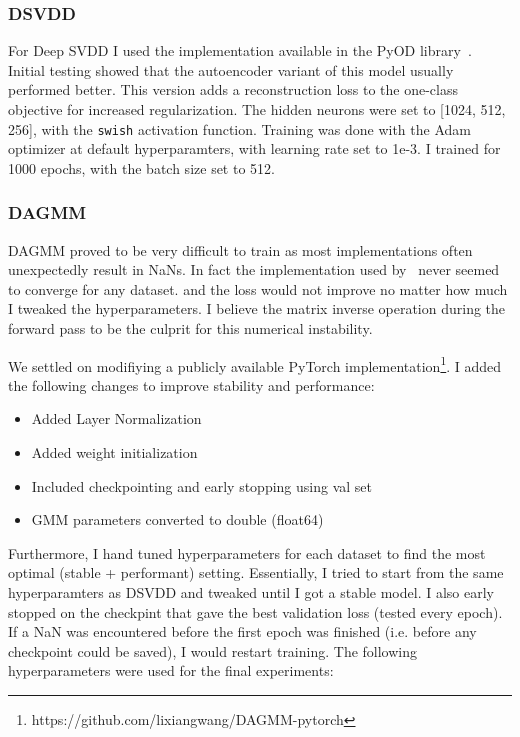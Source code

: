 \subsubsection*{DSVDD}
For Deep SVDD I used the implementation available in the PyOD library~\cite{zhao2019pyod}. Initial testing showed that the autoencoder variant of this model usually performed better. This version adds a reconstruction loss to the one-class objective for increased regularization. The hidden neurons were set to [1024, 512, 256], with the \texttt{swish} activation function. Training was done with the Adam optimizer at default hyperparamters, with learning rate set to 1e-3. I trained for 1000 epochs, with the batch size set to 512.

\subsubsection*{DAGMM}
DAGMM proved to be very difficult to train as most implementations often unexpectedly result in NaNs. In fact the implementation used by~\cite{han2022adbench} never seemed to converge for any dataset. and the loss would not improve no matter how much I tweaked the hyperparameters. I believe the matrix inverse operation during the forward pass to be the culprit for this numerical instability. 

We settled on modifiying a publicly available PyTorch implementation\footnote{https://github.com/lixiangwang/DAGMM-pytorch}. I added the following changes to improve stability and performance:

\begin{itemize}
    \item Added Layer Normalization
    \item Added weight initialization
    \item Included checkpointing and early stopping using val set
    \item GMM parameters converted to double (float64)
\end{itemize}

Furthermore, I hand tuned hyperparameters for each dataset to find the most optimal (stable + performant) setting. Essentially, I tried to start from the same hyperparamters as DSVDD and tweaked until I got a stable model. I also early stopped on the checkpint that gave the best validation loss (tested every epoch). If a NaN was encountered before the first epoch was finished (i.e. before any checkpoint could be saved), I would restart training. The following hyperparameters were used for the final experiments:

